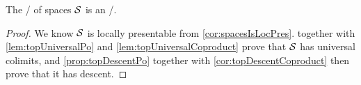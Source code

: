 \begin{corollary}\label{cor:spacesIsInftyTop}
    The \inftycat/ of spaces $\mathcal{S}$ is an \inftytop/.
    \begin{proof}
        We know $\mathcal{S}$ is locally presentable from \cref{cor:spacesIsLocPres}.
         together with \cref{lem:topUniversalPo} and \cref{lem:topUniversalCoproduct} prove that $\mathcal{S}$ has universal colimits, and \cref{prop:topDescentPo} together with \cref{cor:topDescentCoproduct} then prove that it has descent.
    \end{proof}
\end{corollary}
